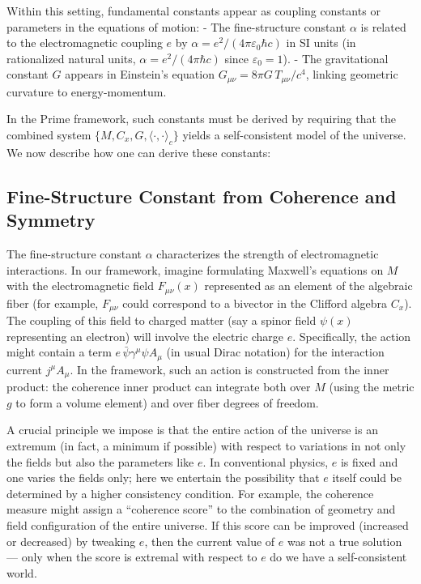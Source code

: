 \documentclass[11pt]{article}
\begin{document}
Within this setting, fundamental constants appear as coupling constants or parameters in the equations of motion:
- The fine-structure constant $\alpha$ is related to the electromagnetic coupling $e$ by $\alpha = e^2/(4\pi\varepsilon_0 \hbar c)$ in SI units (in rationalized natural units, $\alpha = e^2/(4\pi\hbar c)$ since $\varepsilon_0 = 1$).
- The gravitational constant $G$ appears in Einstein's equation $G_{\mu\nu} = 8\pi G\,T_{\mu\nu}/c^4$, linking geometric curvature to energy-momentum.

In the Prime framework, such constants must be derived by requiring that the combined system $\{M, C_x, G, \langle\cdot,\cdot\rangle_c\}$ yields a self-consistent model of the universe. We now describe how one can derive these constants:

\subsection*{Fine-Structure Constant from Coherence and Symmetry}

The fine-structure constant $\alpha$ characterizes the strength of electromagnetic interactions. In our framework, imagine formulating Maxwell's equations on $M$ with the electromagnetic field $F_{\mu\nu}(x)$ represented as an element of the algebraic fiber (for example, $F_{\mu\nu}$ could correspond to a bivector in the Clifford algebra $C_x$). The coupling of this field to charged matter (say a spinor field $\psi(x)$ representing an electron) will involve the electric charge $e$. Specifically, the action might contain a term $e\,\bar{\psi}\gamma^\mu \psi A_\mu$ (in usual Dirac notation) for the interaction current $j^\mu \!A_\mu$. In the framework, such an action is constructed from the inner product: the coherence inner product can integrate both over $M$ (using the metric $g$ to form a volume element) and over fiber degrees of freedom.

A crucial principle we impose is that the entire action of the universe is an extremum (in fact, a minimum if possible) with respect to variations in not only the fields but also the parameters like $e$. In conventional physics, $e$ is fixed and one varies the fields only; here we entertain the possibility that $e$ itself could be determined by a higher consistency condition. For example, the coherence measure might assign a ``coherence score'' to the combination of geometry and field configuration of the entire universe. If this score can be improved (increased or decreased) by tweaking $e$, then the current value of $e$ was not a true solution — only when the score is extremal with respect to $e$ do we have a self-consistent world.
\end{document}
